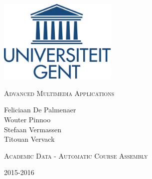 \documentclass[a4paper,12pt]{article}
\begin{document}
\begin{titlepage}
\fontsize{12pt}{14pt}\selectfont

\begin{center}
\includegraphics[height=4cm]{figures/logo}

\vspace{1cm}

\fontsize{14pt}{17pt}\selectfont
\textsc{Advanced Multimedia Applications}
\fontsize{12pt}{14pt}\selectfont
\vspace{1.5cm}

Feliciaan De Palmenaer\\
Wouter Pinnoo\\
Stefaan Vermassen\\
Titouan Vervack

\vspace{2.8cm}

\fontsize{17.28pt}{21pt}\selectfont

\textsc{Academic Data - Automatic Course Assembly}
\fontsize{12pt}{14pt}\selectfont

\vspace{3cm}
2015-2016
\vspace{2cm}

\end{center}
\end{titlepage}
\thispagestyle{empty}

\tableofcontents
\newpage

\fontsize{12pt}{16pt}\selectfont
\end{document}
